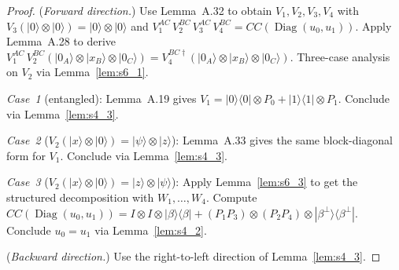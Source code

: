 \begin{proof}
  \leanok
  (\emph{Forward direction.})
  Use Lemma~A.32 to obtain $V_1, V_2, V_3, V_4$ with
  $V_3(|0\rangle \otimes |0\rangle) = |0\rangle \otimes |0\rangle$ and
  $V_1^{AC}\, V_2^{BC}\, V_3^{AC}\, V_4^{BC} = CC(\operatorname{Diag}(u_0, u_1))$.
  Apply Lemma~A.28 to derive
  $V_1^{AC}\, V_2^{BC}(|0_A\rangle \otimes |x_B\rangle \otimes |0_C\rangle)
   = V_4^{BC\dagger}(|0_A\rangle \otimes |x_B\rangle \otimes |0_C\rangle)$.
  Three-case analysis on $V_2$ via Lemma~\ref{lem:s6_1}.

  \emph{Case~1} (entangled):
  Lemma~A.19 gives $V_1 = |0\rangle\langle 0| \otimes P_0 + |1\rangle\langle 1| \otimes P_1$.
  Conclude via Lemma~\ref{lem:s4_3}.

  \emph{Case~2} ($V_2(|x\rangle \otimes |0\rangle) = |\psi\rangle \otimes |z\rangle$):
  Lemma~A.33 gives the same block-diagonal form for $V_1$.
  Conclude via Lemma~\ref{lem:s4_3}.

  \emph{Case~3} ($V_2(|x\rangle \otimes |0\rangle) = |z\rangle \otimes |\psi\rangle$):
  Apply Lemma~\ref{lem:s6_3} to get the structured decomposition with
  $W_1, \ldots, W_4$.
  Compute
  $CC(\operatorname{Diag}(u_0, u_1))
   = I \otimes I \otimes |\beta\rangle\langle\beta|
   + (P_1 P_3) \otimes (P_2 P_4) \otimes |\beta^\perp\rangle\langle\beta^\perp|$.
  Conclude $u_0 = u_1$ via Lemma~\ref{lem:s4_2}.

  (\emph{Backward direction.})
  Use the right-to-left direction of Lemma~\ref{lem:s4_3}.
\end{proof}